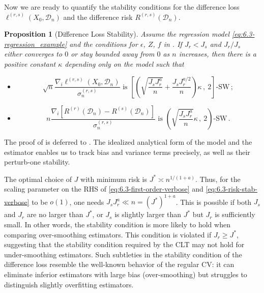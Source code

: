\documentclass[11pt]{article}
\theoremstyle{plain}
\newtheorem{proposition}[theorem]{Proposition}
\newcommand{\D}{{\mathcal{D}}}
\begin{document}

Now we are ready to quantify the stability conditions for the difference loss $\ell^{(r,s)}(X_0,\D_n)$ and the difference risk $R^{(r,s)}(\D_n)$.  

\begin{proposition}[Difference Loss Stability]\label{prop:6.3-lossstab}
Assume the regression model \eqref{eq:6.3-regression_example} and the conditions for $\epsilon$, $Z$, $f$ in . If $J_r<J_s$ and $J_r/J_s$ either converges to $0$ or stay bounded away from $0$ as $n$ increases, then there is a positive constant $\kappa$ depending only on the model such that
\begin{itemize}
    \item[(a)] \begin{equation}\label{eq:6.3-first-order-verbose}
    \sqrt{n}\frac{\nabla_i\ell^{(r,s)}(X_0,\D_n)}{\sigma_n^{(r,s)}} \text{ is }
    \left[\left(\sqrt{\frac{J_sJ_r^a}{n}}+\frac{J_sJ_r^{a/2}}{n}\right)\kappa\,,~2\right]\text{-SW}\,;
\end{equation}
    \item[(b)] \begin{equation}
    \label{eq:6.3-risk-stab-verbose}
    n\frac{\nabla_i \left[R^{(r)}(\D_n)-R^{(s)}(\D_n)\right]}{\sigma_n^{(r,s)}} \text{ is }
    \left(\sqrt{\frac{J_sJ_r^a}{n}}\kappa\,,~2\right)\text{-SW}\,.
\end{equation}
\end{itemize}
\end{proposition}

The proof of  is deferred to .  The idealized analytical form of the model and the estimator enables us to track bias and variance terms precisely, as well as their perturb-one stability.

The optimal choice of $J$ with minimum risk is $J^*\asymp n^{1/(1+a)}$. Thus, for the scaling parameter on the RHS of \eqref{eq:6.3-first-order-verbose} and \eqref{eq:6.3-risk-stab-verbose} to be $o(1)$, one needs $J_sJ_r^{a}\ll n= (J^*)^{1+a}$.  This is possible if both $J_s$ and $J_r$ are no larger than $J^*$, or $J_s$ is slightly larger than $J^*$ but $J_r$ is sufficiently small. In other words, the stability condition is more likely to hold when comparing over-smoothing estimators.  This condition is violated if $J_r\ge J^*$, suggesting that the stability condition required by the CLT may not hold for under-smoothing estimators.  Such subtleties in the stability condition of the difference loss resemble the well-known behavior of the regular CV: it can eliminate inferior estimators with large bias (over-smoothing) but struggles to distinguish slightly overfitting estimators.
\end{document}
